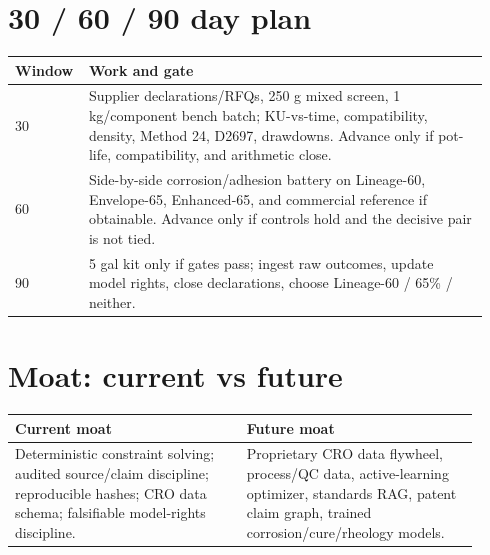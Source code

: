 \documentclass[10pt]{article}
\begin{document}
\section{30 / 60 / 90 day plan}
\begin{longtable}{@{}p{0.12\linewidth} p{0.82\linewidth}@{}}\toprule \textbf{Window} & \textbf{Work and gate} \\ \midrule 30 & Supplier declarations/RFQs, 250 g mixed screen, 1 kg/component bench batch; KU-vs-time, compatibility, density, Method 24, D2697, drawdowns. Advance only if pot-life, compatibility, and arithmetic close. \\ 60 & Side-by-side corrosion/adhesion battery on Lineage-60, Envelope-65, Enhanced-65, and commercial reference if obtainable. Advance only if controls hold and the decisive pair is not tied. \\ 90 & 5 gal kit only if gates pass; ingest raw outcomes, update model rights, close declarations, choose Lineage-60 / 65\% / neither. \\ \bottomrule\end{longtable}
\section{Moat: current vs future}
\begin{longtable}{@{}p{0.46\linewidth} p{0.46\linewidth}@{}}\toprule \textbf{Current moat} & \textbf{Future moat} \\ \midrule Deterministic constraint solving; audited source/claim discipline; reproducible hashes; CRO data schema; falsifiable model-rights discipline. & Proprietary CRO data flywheel, process/QC data, active-learning optimizer, standards RAG, patent claim graph, trained corrosion/cure/rheology models. \\ \bottomrule\end{longtable}
\newpage
\end{document}
